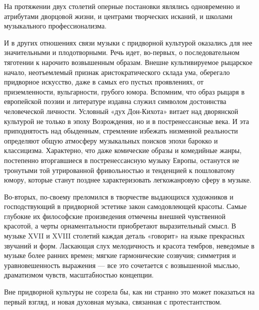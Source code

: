 На протяжении двух столетий оперные постановки являлись одновременно и
атрибутами дворцовой  жизни, и центрами творческих  исканий, и школами
музыкального профессионализма.

И   в  других   отношениях   связи  музыки   с  придворной   культурой
оказались   для  нее   значительными  и   плодотворными.  Речь   идет,
во-первых,  о   последовательном  тяготении  к   нарочито  возвышенным
образам. Внешне культивируемое  рыцарское начало, неотъемлемый признак
аристократического склада ума, оберегало  придворное искусство, даже в
самых его пустых проявлениях, от приземленности, вульгарности, грубого
юмора. Вспомним,  что образ рыцаря  в европейской поэзии  и литературе
издавна  служил символом  достоинства человеческой  личности. Условный
«дух Дон-Кихота»  витает над  дворянской культурой  не только  в эпоху
Возрождения, но  и в  постренессансные века.  И эта  приподнятость над
обыденным, стремление  избежать низменной реальности  определяют общую
атмосферу музыкальных поисков эпохи барокко и классицизма. Характерно,
что даже комические образы и комедийные жанры, постепенно вторгавшиеся
в  постренессансную   музыку  Европы,   останутся  не   тронутыми  той
утрированной фривольностью  и тенденцией к пошловатому  юмору, которые
станут позднее характеризовать легкожанровую сферу в музыке.

Во-вторых,  по-своему преломился  в  творчестве выдающихся  художников
и   господствующий   в   придворной   эстетике   закон   самодовлеющей
красоты.   Самые  глубокие   их   философские  произведения   отмечены
внешней  чувственной красотой,  а  черты орнаментальности  приобретают
выразительный  смысл. В  музыке XVII  и XVIII  столетий каждая  деталь
«говорит»  на  языке  прекрасных   звучаний  и  форм.  Ласкающая  слух
мелодичность  и  красота  тембров,  неведомые в  музыке  более  ранних
времен;  мягкие гармонические  созвучия; симметрия  и уравновешенность
выражения  --- все  это сочетается  с возвышенной  мыслью, драматизмом
чувств, масштабностью концепции.

Вне  придворной культуры  не  созрела  бы, как  ни  странно это  может
показаться  на первый  взгляд, и  новая духовная  музыка, связанная  с
протестантством.

